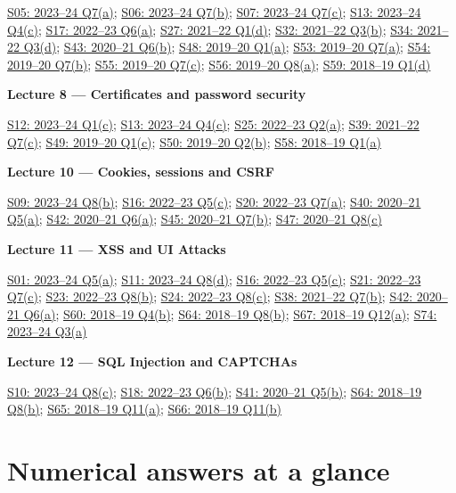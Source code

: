 \documentclass[11pt,a4paper]{article}
\begin{document}
\hyperref[s05]{S05: 2023–24 Q7(a)}; \hyperref[s06]{S06: 2023–24 Q7(b)}; \hyperref[s07]{S07: 2023–24 Q7(c)}; \hyperref[s13]{S13: 2023–24 Q4(c)}; \hyperref[s17]{S17: 2022–23 Q6(a)}; \hyperref[s27]{S27: 2021–22 Q1(d)}; \hyperref[s32]{S32: 2021–22 Q3(b)}; \hyperref[s34]{S34: 2021–22 Q3(d)}; \hyperref[s43]{S43: 2020–21 Q6(b)}; \hyperref[s48]{S48: 2019–20 Q1(a)}; \hyperref[s53]{S53: 2019–20 Q7(a)}; \hyperref[s54]{S54: 2019–20 Q7(b)}; \hyperref[s55]{S55: 2019–20 Q7(c)}; \hyperref[s56]{S56: 2019–20 Q8(a)}; \hyperref[s59]{S59: 2018–19 Q1(d)}


\textbf{Lecture 8 — Certificates and password security}


\hyperref[s12]{S12: 2023–24 Q1(c)}; \hyperref[s13]{S13: 2023–24 Q4(c)}; \hyperref[s25]{S25: 2022–23 Q2(a)}; \hyperref[s39]{S39: 2021–22 Q7(c)}; \hyperref[s49]{S49: 2019–20 Q1(c)}; \hyperref[s50]{S50: 2019–20 Q2(b)}; \hyperref[s58]{S58: 2018–19 Q1(a)}


\textbf{Lecture 10 — Cookies,\allowbreak{} sessions and CSRF}


\hyperref[s09]{S09: 2023–24 Q8(b)}; \hyperref[s16]{S16: 2022–23 Q5(c)}; \hyperref[s20]{S20: 2022–23 Q7(a)}; \hyperref[s40]{S40: 2020–21 Q5(a)}; \hyperref[s42]{S42: 2020–21 Q6(a)}; \hyperref[s45]{S45: 2020–21 Q7(b)}; \hyperref[s47]{S47: 2020–21 Q8(c)}


\textbf{Lecture 11 — XSS and UI Attacks}


\hyperref[s01]{S01: 2023–24 Q5(a)}; \hyperref[s11]{S11: 2023–24 Q8(d)}; \hyperref[s16]{S16: 2022–23 Q5(c)}; \hyperref[s21]{S21: 2022–23 Q7(c)}; \hyperref[s23]{S23: 2022–23 Q8(b)}; \hyperref[s24]{S24: 2022–23 Q8(c)}; \hyperref[s38]{S38: 2021–22 Q7(b)}; \hyperref[s42]{S42: 2020–21 Q6(a)}; \hyperref[s60]{S60: 2018–19 Q4(b)}; \hyperref[s64]{S64: 2018–19 Q8(b)}; \hyperref[s67]{S67: 2018–19 Q12(a)}; \hyperref[s74]{S74: 2023–24 Q3(a)}


\textbf{Lecture 12 — SQL Injection and CAPTCHAs}


\hyperref[s10]{S10: 2023–24 Q8(c)}; \hyperref[s18]{S18: 2022–23 Q6(b)}; \hyperref[s41]{S41: 2020–21 Q5(b)}; \hyperref[s64]{S64: 2018–19 Q8(b)}; \hyperref[s65]{S65: 2018–19 Q11(a)}; \hyperref[s66]{S66: 2018–19 Q11(b)}



\clearpage
\section{Numerical answers at a glance}
\end{document}

